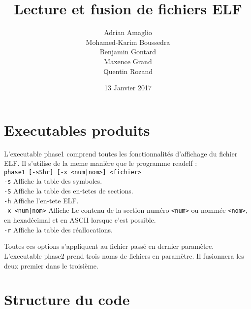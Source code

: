 \documentclass[10pt,oneside]{article}   %
\begin{document}
\title{Lecture et fusion de fichiers ELF}           %
\author{Adrian Amaglio\\Mohamed-Karim Boussedra\\Benjamin Gontard\\Maxence Grand\\Quentin Rozand}
\date{13 Janvier 2017}
\maketitle
\tableofcontents
\pagebreak

\section{Executables produits}
	\begin{minipage}{\textwidth}
		L'executable phase1 comprend toutes les fonctionnalités d'affichage du fichier ELF. 
		Il s'utilise de la meme manière que le programme readelf \cite{readelf}:\\
			\texttt{phase1 [-sShr] [-x <num|nom>] <fichier>}\\
			\texttt{-s} Affiche la table des symboles.\\
			\texttt{-S} Affiche la table des en-tetes de sections.\\
			\texttt{-h} Affiche l'en-tete ELF.\\
			\texttt{-x <num|nom>} Affiche Le contenu de la section numéro \texttt{<num>} ou nommée \texttt{<nom>}, en hexadécimal et en ASCII lorsque c'est possible.\\
			\texttt{-r} Affiche la table des réallocations.\\
	\end{minipage}
	Toutes ces options s'appliquent au fichier passé en dernier paramètre. L'executable phase2 prend trois noms de fichiers en paramètre. Il fusionnera les deux premier dans le troisième.

\section{Structure du code}
\end{document}
